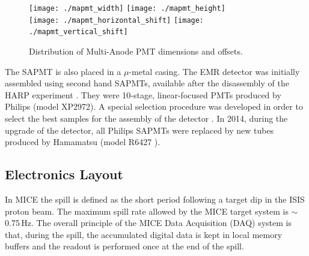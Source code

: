 \documentclass[a4paper,11pt]{article}
\begin{document}
\begin{figure}[h]
 \centering
 \texttt{[image: ./mapmt\_width]}
 \texttt{[image: ./mapmt\_height]}\\
 \texttt{[image: ./mapmt\_horizontal\_shift]}
 \texttt{[image: ./mapmt\_vertical\_shift]}
 \caption[Distribution of Multi-Anode PMT dimensions]{Distribution of Multi-Anode PMT dimensions and offsets.}
 \label{fig:mapmt_dimensions}
\end{figure}

The SAPMT is also placed in a $\mu$-metal casing. The EMR detector was initially assembled
using second hand SAPMTs, available after the disassembly of the HARP experiment \cite{harp}. They were 10-stage, linear-focused PMTs produced
by Philips (model XP2972). A special selection procedure was developed in order to select the best samples for the assembly of the detector
\cite{philips}. In 2014, during the upgrade of the detector, all Philips SAPMTs were replaced by new tubes produced by Hamamatsu (model R6427
\cite{hamamatsu_mapmt}).

\subsection{Electronics Layout}
In MICE the spill is defined as the short period following a target dip in the ISIS proton beam. The maximum spill rate allowed by the
MICE target system is $\sim\,$0.75\,Hz. The overall principle of the MICE Data Acquisition (DAQ) system is that, during the spill, the
accumulated digital data is kept in local memory buffers and the readout is performed once at the end of the spill.
\end{document}
